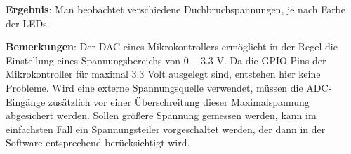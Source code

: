 \documentclass[../main.tex]{subfiles}
\begin{document}
\begin{tcolorbox}
    \vspace{0.5cm}
\textbf{Ergebnis}: Man beobachtet verschiedene Duchbruchspannungen, je nach Farbe der LEDs. 

\vspace{0.5cm}
\textbf{Bemerkungen}: Der DAC eines Mikrokontrollers ermöglicht in der Regel die Einstellung eines Spannungsbereichs von $0-3.3$ V. Da die GPIO-Pins der Mikrokontroller für maximal $3.3$ Volt ausgelegt sind, entstehen hier keine Probleme. Wird eine externe Spannungsquelle verwendet, müssen die ADC-Eingänge zusätzlich vor einer Überschreitung dieser Maximalspannung abgesichert werden. Sollen größere Spannung gemessen werden, kann im einfachsten Fall ein Spannungsteiler vorgeschaltet werden, der dann in der Software entsprechend berücksichtigt wird.

\end{tcolorbox}
\end{document}
